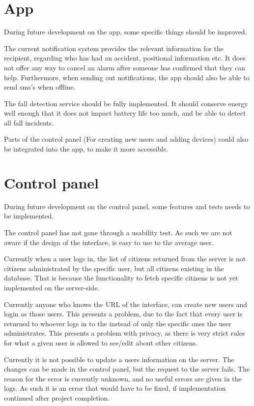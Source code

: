 \section{App}
During future development on the app, some specific things should be improved.

The current notification system provides the relevant information for the recipient, regarding who has had an accident, positional information etc. It does not offer any way to cancel an alarm after someone has confirmed that they can help.
Furthermore, when sending out notifications, the app should also be able to send sms's when offline.

The fall detection service should be fully implemented.
It should conserve energy well enough that it does not impact battery life too much, and be able to detect all fall incidents. \label{app:falldetectionservice}

Parts of the control panel (For creating new users and adding devices) could also be integrated into the app, to make it more accessible.

\section{Control panel}\label{sec:discussion:controlPanel}
During future development on the control panel, some features and tests needs to be implemented.

The control panel has not gone through a usability test. As such we are not aware if the design of the interface, is easy to use to the average user.

Currently when a user logs in, the list of citizens returned from the server is not citizens administrated by the specific user, but all citizens existing in the database. That is because the functionality to fetch specific citizens is not yet implemented on the server-side.

Currently anyone who knows the URL of the interface, can create new users and login as those users. This presents a problem, due to the fact that every user is returned to whoever logs in to the instead of only the specific ones the user administrates. This presents a problem with privacy, as there is very strict rules for what a given user is allowed to see/edit about other citizens.

Currently it is not possible to update a users information on the server. The changes can be made in the control panel, but the request to the server fails. The reason for the error is currently unknown, and no useful errors are given in the logs. As such it is an error that would have to be fixed, if implementation continued after project completion.

